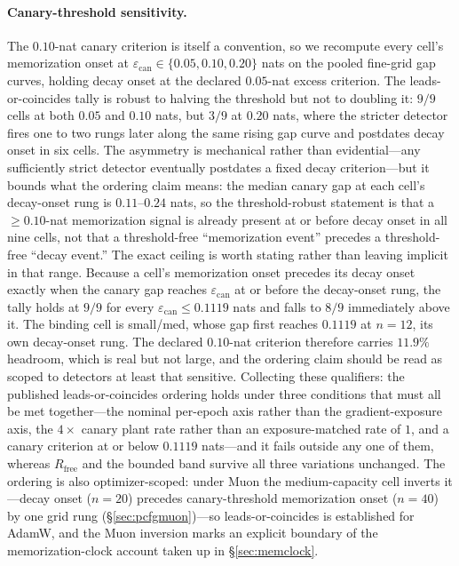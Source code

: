 \documentclass[11pt]{article}
\begin{document}
\paragraph{Canary-threshold sensitivity.}\label{par:cansens}
The $0.10$-nat canary criterion is itself a convention, so we recompute every
cell's memorization onset at $\varepsilon_{\mathrm{can}} \in \{0.05, 0.10, 0.20\}$
nats on the pooled fine-grid gap curves, holding decay onset at the declared
$0.05$-nat excess criterion. The leads-or-coincides tally is robust to halving the
threshold but not to doubling it: $9/9$ cells at both $0.05$ and $0.10$ nats, but
$3/9$ at $0.20$ nats, where the stricter detector fires one to two rungs later
along the same rising gap curve and postdates decay onset in six cells. The
asymmetry is mechanical rather than evidential---any sufficiently strict detector
eventually postdates a fixed decay criterion---but it bounds what the ordering
claim means: the median canary gap at each cell's decay-onset rung is
$0.11$--$0.24$ nats, so the threshold-robust statement is that a ${\geq}0.10$-nat
memorization signal is already present at or before decay onset in all nine cells,
not that a threshold-free ``memorization event'' precedes a threshold-free
``decay event.'' The exact ceiling is worth stating rather than leaving implicit
in that range. Because a cell's memorization onset precedes its decay onset
exactly when the canary gap reaches $\varepsilon_{\mathrm{can}}$ at or before the
decay-onset rung, the tally holds at $9/9$ for every
$\varepsilon_{\mathrm{can}} \leq 0.1119$ nats and falls to $8/9$ immediately
above it. The binding cell is small/med, whose gap first reaches $0.1119$ at
$n{=}12$, its own decay-onset rung. The declared $0.10$-nat criterion therefore
carries $11.9\%$ headroom, which is real but not large, and the ordering claim
should be read as scoped to detectors at least that sensitive. Collecting these
qualifiers: the published leads-or-coincides ordering holds under three conditions
that must all be met together---the nominal per-epoch axis rather than the
gradient-exposure axis, the $4\times$ canary plant rate rather than an
exposure-matched rate of $1$, and a canary criterion at or below $0.1119$
nats---and it fails outside any one of them, whereas $R_{\mathrm{free}}$ and the
bounded band survive all three variations unchanged. The ordering is also optimizer-scoped: under Muon the
medium-capacity cell inverts it---decay onset ($n{=}20$) precedes
canary-threshold memorization onset ($n{=}40$) by one grid rung
(\S\ref{sec:pcfgmuon})---so leads-or-coincides is established for AdamW, and the
Muon inversion marks an explicit boundary of the memorization-clock account taken
up in \S\ref{sec:memclock}.
\end{document}
